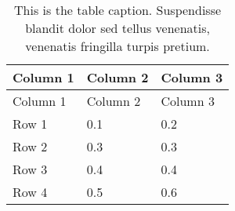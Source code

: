 \documentclass[12pt,turkish,a4paperpaper,]{report}
\begin{document}
\begin{longtable}[]{@{}lll@{}}
\caption{This is the table caption. Suspendisse blandit dolor sed tellus
venenatis, venenatis fringilla turpis pretium.
\label{ref_a_table}}\tabularnewline
\toprule
\begin{minipage}[b]{0.25\columnwidth}\raggedright
Column 1\strut
\end{minipage} & \begin{minipage}[b]{0.30\columnwidth}\raggedright
Column 2\strut
\end{minipage} & \begin{minipage}[b]{0.24\columnwidth}\raggedright
Column 3\strut
\end{minipage}\tabularnewline
\midrule
\endfirsthead
\toprule
\begin{minipage}[b]{0.25\columnwidth}\raggedright
Column 1\strut
\end{minipage} & \begin{minipage}[b]{0.30\columnwidth}\raggedright
Column 2\strut
\end{minipage} & \begin{minipage}[b]{0.24\columnwidth}\raggedright
Column 3\strut
\end{minipage}\tabularnewline
\midrule
\endhead
\begin{minipage}[t]{0.25\columnwidth}\raggedright
Row 1\strut
\end{minipage} & \begin{minipage}[t]{0.30\columnwidth}\raggedright
0.1\strut
\end{minipage} & \begin{minipage}[t]{0.24\columnwidth}\raggedright
0.2\strut
\end{minipage}\tabularnewline
\begin{minipage}[t]{0.25\columnwidth}\raggedright
Row 2\strut
\end{minipage} & \begin{minipage}[t]{0.30\columnwidth}\raggedright
0.3\strut
\end{minipage} & \begin{minipage}[t]{0.24\columnwidth}\raggedright
0.3\strut
\end{minipage}\tabularnewline
\begin{minipage}[t]{0.25\columnwidth}\raggedright
Row 3\strut
\end{minipage} & \begin{minipage}[t]{0.30\columnwidth}\raggedright
0.4\strut
\end{minipage} & \begin{minipage}[t]{0.24\columnwidth}\raggedright
0.4\strut
\end{minipage}\tabularnewline
\begin{minipage}[t]{0.25\columnwidth}\raggedright
Row 4\strut
\end{minipage} & \begin{minipage}[t]{0.30\columnwidth}\raggedright
0.5\strut
\end{minipage} & \begin{minipage}[t]{0.24\columnwidth}\raggedright
0.6\strut
\end{minipage}\tabularnewline
\bottomrule
\end{longtable}
\end{document}
